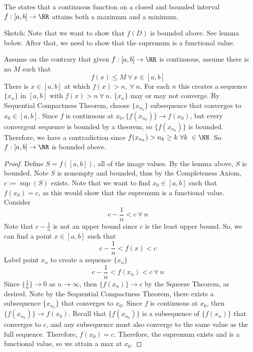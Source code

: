 \documentclass[12pt]{scrartcl}
\begin{document}
\begin{theorem}
  The  states that a continuous function on a closed and bounded interval $f: [a, b] \to \RR$ attains
  both a maximum and a minimum. 

  Sketch: Note that we want to show that $f(D)$ is bounded above. See lemma below. 
  After that, we need to show that the supremum is a functional value.

  \begin{lemma}
    Assume on the contrary that given $f: [a, b] \to \RR$ is continuous, assume there is no
    $M$ such that 
    \[f(x) \leq M \ \forall \ x \in [a, b]\]
    There is $x \in [a, b]$ at which $f(x) > n, \ \forall \ n$. For each $n$ this creates 
    a sequence $\{x_n\}$ in $[a, b]$ with $f(x) > n \ \forall \ n$.  $\{x_n\}$ may or may not converge. 
    By Sequential Compactness Theorem, choose $\{x_{n_k}\}$ subsequence that converges to $x_0 \in [a, b]$.
    Since $f$ is continuous at $x_0, \{f(x_{n_k})\} \to f(x_0)$, but every convergent sequence 
    is bounded by a theorem, so $\{f(x_{n_k})\}$ is bounded. Therefore, we have a contradiction 
    since $f(x_{n_k}) > n_k \geq k \ \forall k \ \in \NN$. So $f: [a, b] \to \RR$ is bounded above.
  \end{lemma}

  \begin{proof}
    Define $S = f([a, b])$, all of the image values. By the lemma above, $S$ is bounded. Note 
    $S$ is nonempty and bounded, thus by the Completeness Axiom, $c := \sup(S)$ exists.
    Note that we want to find $x_0 \in [a, b]$ such that $f(x_0) = c$, as this would show that 
    the supremum is a functional value. Consider 
    \[c - \frac{1}{n} < c \ \forall \ n\]
    Note that $c - \frac{1}{n}$ is not an upper bound since $c$ is the least upper bound. So, 
    we can find a point $x \in [a, b]$ such that 
    \[c - \frac{1}{n} < f(x) < c\]
    Label point $x_n$ to create a sequence $\{x_n\}$ 
    \[c - \frac{1}{n} < f(x_n) < c \ \forall \ n\] 
    Since $\{\frac{1}{n}\} \to 0$ as $n \to \infty$, then $\{f(x_n)\} \to c$ by the Squeeze Theorem, as desired.
    Note by the Sequential Compactness Theorem, there exists a subsequence $\{x_{n_k}\}$ that converges to 
    $x_0$. Since $f$ is continuous at $x_0$, then $\{f(x_{n_k})\} \to f(x_0)$. Recall that 
    $\{f(x_{n_k})\}$ is a subsequence of $\{f(x_n)\}$ that converges to $c$, and any subsequence must 
    also converge to the same value as the full sequence. Therefore, $f(x_0) = c$. 
    Therefore, the supremum exists and is a functional value, so we attain a max at $x_0$. 
  \end{proof}

\end{theorem}
\end{document}
